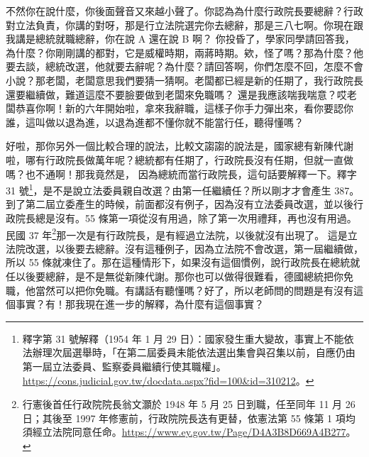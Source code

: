 \hypertarget{c08:cue:92}{}不然你在說什麼，你後面聲音又來越小聲了。你認為為什麼行政院長要總辭？行政對立法負責，你講的對呀，那是行立法院選完你去總辭，那是三八七啊。你現在跟我講是總統就職總辭，你在說 A 還在說 B 啊？
\hypertarget{c08:cue:93}{}你投昏了，學家同學請回答我，為什麼？你剛剛講的都對，它是威權時期，兩蔣時期。欸，怪了嗎？那為什麼？他要去談，總統改選，他就要去辭呢？為什麼？請回答啊，你們怎麼不回，怎麼不會小說？那老闆，老闆意思我們要猜一猜啊。老闆都已經是新的任期了，我行政院長還要繼續做，難道這麼不要臉要做到老闆來免職嗎？
\hypertarget{c08:cue:94}{}還是我應該喘我喘意？哎老闆恭喜你啊！新的六年開始啦，拿來我辭職，這樣子你手力彈出來，看你要認你誰，這叫做以退為進，以退為進都不懂你就不能當行任，聽得懂嗎？

\hypertarget{c08:cue:95}{}好啦，那你另外一個比較合理的說法，比較文謅謅的說法是，國家總有新陳代謝啦，哪有行政院長做萬年呢？總統都有任期了，行政院長沒有任期，但就一直做嗎？也不通啊！那我竟然是，
\hypertarget{c08:cue:96}{}因為總統而當行政院長，這句話要解釋一下。釋字 31 號\footnote{釋字第 31 號解釋（1954 年 1 月 29 日）：國家發生重大變故，事實上不能依法辦理次屆選舉時，「在第二屆委員未能依法選出集會與召集以前，自應仍由第一屆立法委員、監察委員繼續行使其職權」。\url{https://cons.judicial.gov.tw/docdata.aspx?fid=100&id=310212}。}，是不是說立法委員親自改選？由第一任繼續任？所以剛才才會產生 387。到了第二屆立委產生的時候，前面都沒有例子，因為沒有立法委員改選，並以後行政院長總是沒有。55 條第一項從沒有用過，除了第一次用禮拜，再也沒有用過。民國 37 年\footnote{行憲後首任行政院院長翁文灝於 1948 年 5 月 25 日到職，任至同年 11 月 26 日；其後至 1997 年修憲前，行政院院長迭有更替，依憲法第 55 條第 1 項均須經立法院同意任命。\url{https://www.ey.gov.tw/Page/D4A3B8D669A4B277}。}那一次是有行政院長，是有經過立法院，以後就沒有出現了。
\hypertarget{c08:cue:97}{}這是立法院改選，以後要去總辭。沒有這種例子，因為立法院不會改選，第一屆繼續做，所以 55 條就凍住了。那在這種情形下，如果沒有這個慣例，說行政院長在總統就任以後要總辭，是不是無從新陳代謝。那你也可以做得很難看，德國總統把你免職，他當然可以把你免職。有講話有聽懂嗎？好了，所以老師問的問題是有沒有這個事實？有！那我現在進一步的解釋，為什麼有這個事實？

